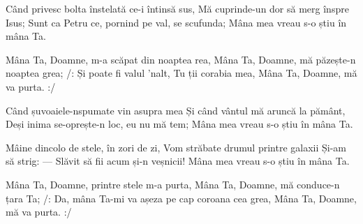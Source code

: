 \beginverse
Când privesc bolta înstelată ce-i întinsă sus,
Mă cuprinde-un dor să merg înspre Isus;
Sunt ca Petru ce, pornind pe val, se scufunda;
Mâna mea vreau s-o știu în mâna Ta.
\endverse

\beginchorus
Mâna Ta, Doamne, m-a scăpat din noaptea rea,
Mâna Ta, Doamne, mă păzește-n noaptea grea;
/: Și poate fi valul 'nalt, Tu ții corabia mea,
Mâna Ta, Doamne, mă va purta. :/
\endchorus

\beginverse
Când șuvoaiele-nspumate vin asupra mea
Și când vântul mă aruncă la pământ,
Deși inima se-oprește-n loc, eu nu mă tem;
Mâna mea vreau s-o știu în mâna Ta.
\endverse

\beginverse
Mâine dincolo de stele, în zori de zi,
Vom străbate drumul printre galaxii
Și-am să strig: — Slăvit să fii acum și-n veșnicii!
Mâna mea vreau s-o știu în mâna Ta.
\endverse

\beginchorus
Mâna Ta, Doamne, printre stele m-a purta,
Mâna Ta, Doamne, mă conduce-n țara Ta;
/: Da, mâna Ta-mi va așeza pe cap coroana cea grea,
Mâna Ta, Doamne, mă va purta. :/
\endchorus
\endsong